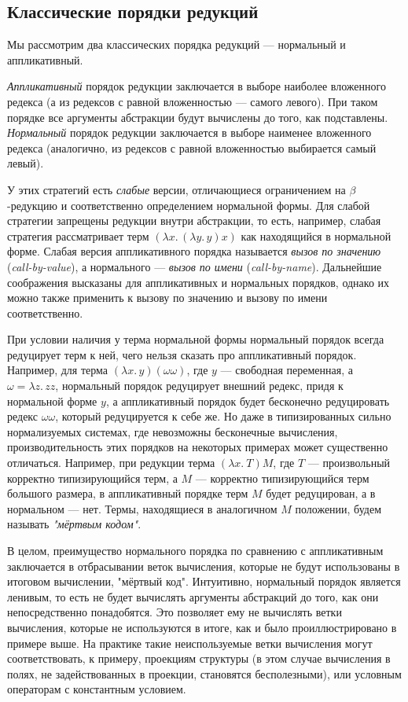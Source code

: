 \documentclass[../thesis.tex]{subfiles}
\begin{document}
\subsection{Классические порядки редукций} \label{orders}

Мы рассмотрим два классических порядка редукций --- нормальный и аппликативный. 

\textit{Аппликативный} порядок редукции заключается в выборе наиболее вложенного редекса (а из редексов с равной вложенностью --- самого левого). При таком порядке все аргументы абстракции будут вычислены до того, как подставлены. \textit{Нормальный} порядок редукции заключается в выборе наименее вложенного редекса (аналогично, из редексов с равной вложенностью выбирается самый левый).

У этих стратегий есть \textit{слабые} версии, отличающиеся ограничением на $\beta$-редукцию и соответственно определением нормальной формы. Для слабой стратегии запрещены редукции внутри абстракции, то есть, например, слабая стратегия рассматривает терм $(\lambda x.\, (\lambda y.\, y) x)$ как находящийся в нормальной форме. Слабая версия аппликативного порядка называется \textit{вызов по значению} (\textit{call-by-value}), а нормального --- \textit{вызов по имени} (\textit{call-by-name}). Дальнейшие соображения высказаны для аппликативных и нормальных порядков, однако их можно также применить к вызову по значению и вызову по имени соответственно.

При условии наличия у терма нормальной формы нормальный порядок всегда редуцирует терм к ней, чего нельзя сказать про аппликативный порядок. Например, для терма $(\lambda x.\, y) (\omega \omega)$, где $y$ --- свободная переменная, а $\omega = \lambda z.\, z z$, нормальный порядок редуцирует внешний редекс, придя к нормальной форме $y$, а аппликативный порядок будет бесконечно редуцировать редекс $\omega \omega$, который редуцируется к себе же. Но даже в типизированных сильно нормализуемых системах, где невозможны бесконечные вычисления, производительность этих порядков на некоторых примерах может существенно отличаться. Например, при редукции терма $(\lambda x.\ T) M$, где $T$ --- произвольный корректно типизирующийся терм, а $M$ --- корректно типизирующийся терм большого размера, в аппликативный порядке терм $M$ будет редуцирован, а в нормальном --- нет. Термы, находящиеся в аналогичном $M$ положении, будем называть \textit{"мёртвым кодом"}. 

В целом, преимущество нормального порядка по сравнению с аппликативным заключается в отбрасывании веток вычисления, которые не будут использованы в итоговом вычислении, "мёртвый код". Интуитивно, нормальный порядок является ленивым, то есть не будет вычислять аргументы абстракций до того, как они непосредственно понадобятся. Это позволяет ему не вычислять ветки вычисления, которые не используются в итоге, как и было проиллюстрировано в примере выше. На практике такие неиспользуемые ветки вычисления могут соответствовать, к примеру, проекциям структуры (в этом случае вычисления в полях, не задействованных в проекции, становятся бесполезными), или условным операторам с константным условием.
\end{document}
